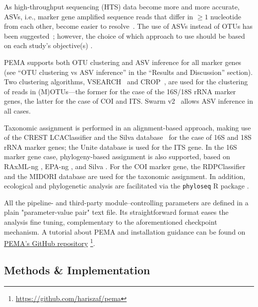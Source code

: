    As high-throughput sequencing (HTS) data become more and more accurate, ASVs, 
   i.e., marker gene amplified sequence reads that differ in $≥1$ nucleotide from each other, 
   become easier to resolve~\citep{callahan2017exact}. 
   The use of ASVs instead of OTUs has been suggested~\citep{callahan2017exact}; 
   however, the choice of which approach to use should be based on each study's 
   objective(s) \citep{pauvert2019bioinformatics}.
   
   PEMA supports both OTU clustering and ASV inference for all marker genes 
   (see “OTU clustering vs ASV inference” in the “Results and Discussion” section). 
   Two clustering algorithms, VSEARCH~\citep{rognes2016vsearch} and CROP~\citep{hao2011clustering}, 
   are used for the clustering of reads in (M)OTUs—the former for the case of 
   the 16S/18S rRNA marker genes, the latter for the case of COI and ITS. 
   Swarm v2~\citep{mahe2015swarm} allows ASV inference in all cases.
   
   Taxonomic assignment is performed in an alignment-based approach, making use of the 
   CREST LCAClassifier \citep{lanzen2012crest} and the Silva database~\citep{quast_silva_2013} 
   for the case of 16S and 18S rRNA marker genes; 
   the Unite database \citep{nilsson2019unite} is used for the ITS gene. 
   In the 16S marker gene case, phylogeny-based assignment is also supported, based on 
   RAxML-ng \citep{kozlov2019raxml}, 
   EPA-ng \citep{barbera2019epa}, and Silva \citep{quast_silva_2013}. 
   For the COI marker gene, the RDPClassifier \citep{wang2007naive} and the 
   MIDORI database \citep{machida2017metazoan} are used for the taxonomic assignment. 
   In addition, ecological and phylogenetic analysis are facilitated via the \texttt{phyloseq} 
   R package \citep{mcmurdie2013phyloseq}.
   
   All the pipeline- and third-party module–controlling parameters are defined in a 
   plain "parameter-value pair" text file. 
   Its straightforward format eases the analysis fine tuning, complementary to the 
   aforementioned checkpoint mechanism. A tutorial about PEMA and installation guidance 
   can be found on \href{https://github.com/hariszaf/pema}{PEMA's GitHub repository} 
   \footnote{
      \href{https://github.com/hariszaf/pema}{https://github.com/hariszaf/pema}
   }.


   \subsection{Methods \& Implementation}

